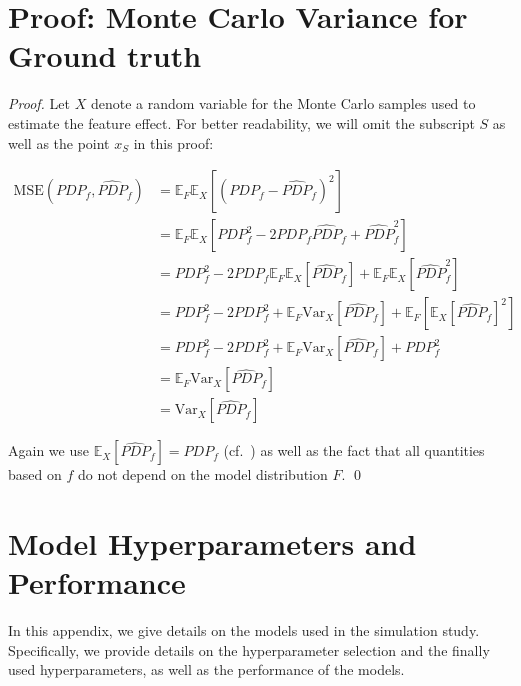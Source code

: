 \documentclass[runningheads]{llncs}
\begin{document}
\section{Proof: Monte Carlo Variance for Ground truth}\label{app:proof-mc-variance}
\begin{proof}
    Let $X$ denote a random variable for the Monte Carlo samples used to estimate the feature effect.
    For better readability, we will omit the subscript $S$ as well as the point $x_S$ in this proof:

    \begin{align*}
        \text{MSE}(PDP_{f}, \widehat{PDP}_{f}) & = \mathbb{E}_F\mathbb{E}_X[{(PDP_f - \widehat{PDP}_f)}^2]                                                          \\
                                               & = \mathbb{E}_F\mathbb{E}_X[PDP_f^2 - 2PDP_f \widehat{PDP}_f + \widehat{PDP}_f^2]                                   \\
                                               & = PDP_f^2 - 2PDP_f \mathbb{E}_F\mathbb{E}_X[\widehat{PDP}_f] + \mathbb{E}_F\mathbb{E}_X[\widehat{PDP}_f^2]         \\
                                               & = PDP_f^2 - 2PDP_f^2 + \mathbb{E}_F\text{Var}_X[\widehat{PDP}_f] + \mathbb{E}_F[\mathbb{E}_X{[\widehat{PDP}_f]}^2] \\
                                               & = PDP_f^2 - 2PDP_f^2 + \mathbb{E}_F\text{Var}_X[\widehat{PDP}_f] + PDP_f^2                                         \\
                                               & = \mathbb{E}_F\text{Var}_X[\widehat{PDP}_f]                                                                        \\
                                               & = \text{Var}_X[\widehat{PDP}_f]
    \end{align*}

    \noindent Again we use $\mathbb{E}_X[\widehat{PDP}_{f}] = PDP_{f}$ (cf.~\cite{molnar_relating_2023}) as well as the fact
    that all quantities based on $f$ do not depend on the model distribution $F$.
    \qed\
\end{proof}

\section{Model Hyperparameters and Performance}\label{app:model-hps-perf}
In this appendix, we give details on the models used in the simulation study.
Specifically, we provide details on the hyperparameter selection and the
finally used hyperparameters, as well as the performance of the models.
\end{document}

